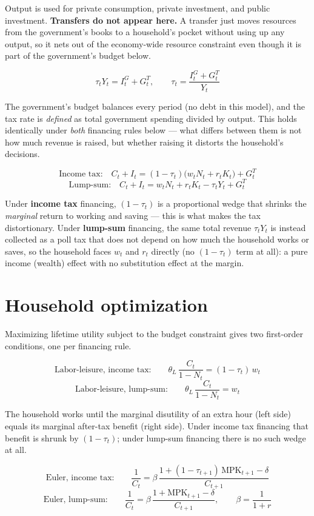 \documentclass[11pt]{article}
\newcommand{\eq}[1]{\begin{equation}#1\end{equation}}
\begin{document}
Output is used for private consumption, private investment, and public
investment. \textbf{Transfers do not appear here.} A transfer just moves
resources from the government's books to a household's pocket without using
up any output, so it nets out of the economy-wide resource constraint even
though it is part of the government's budget below.

\eq{ \tau_t Y_t = I^G_t + G^T_t, \qquad \tau_t = \frac{I^G_t+G^T_t}{Y_t} }

The government's budget balances every period (no debt in this model), and
the tax rate is \emph{defined} as total government spending divided by
output. This holds identically under \emph{both} financing rules below ---
what differs between them is not how much revenue is raised, but whether
raising it distorts the household's decisions.

\eq{ \text{Income tax:}\quad C_t+I_t = (1-\tau_t)\big(w_tN_t+r_tK_t\big) + G^T_t }
\eq{ \text{Lump-sum:}\quad C_t+I_t = w_tN_t+r_tK_t - \tau_tY_t + G^T_t }

Under \textbf{income tax} financing, $(1-\tau_t)$ is a proportional wedge
that shrinks the \emph{marginal} return to working and saving --- this is
what makes the tax distortionary. Under \textbf{lump-sum} financing, the
same total revenue $\tau_t Y_t$ is instead collected as a poll tax that does
not depend on how much the household works or saves, so the household faces
$w_t$ and $r_t$ directly (no $(1-\tau_t)$ term at all): a pure income
(wealth) effect with no substitution effect at the margin.

\section{Household optimization}

Maximizing lifetime utility subject to the budget constraint gives two
first-order conditions, one per financing rule.

\eq{ \text{Labor-leisure, income tax:}\qquad \theta_L\,\frac{C_t}{1-N_t} = (1-\tau_t)\,w_t }
\eq{ \text{Labor-leisure, lump-sum:}\qquad \theta_L\,\frac{C_t}{1-N_t} = w_t }

The household works until the marginal disutility of an extra hour (left
side) equals its marginal after-tax benefit (right side). Under income tax
financing that benefit is shrunk by $(1-\tau_t)$; under lump-sum financing
there is no such wedge at all.

\eq{ \text{Euler, income tax:}\qquad \frac{1}{C_t} = \beta\,\frac{1+(1-\tau_{t+1})\,\mathrm{MPK}_{t+1}-\delta}{C_{t+1}} }
\eq{ \text{Euler, lump-sum:}\qquad \frac{1}{C_t} = \beta\,\frac{1+\mathrm{MPK}_{t+1}-\delta}{C_{t+1}},\qquad \beta=\frac{1}{1+r} }
\end{document}
